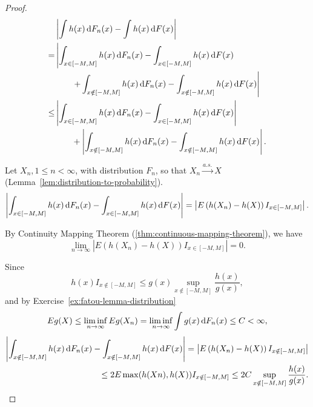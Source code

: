\begin{proof}
	\begin{equation*}
		\begin{aligned}
			     & \left|\int h(x)\dif F_{n}(x)-\int h(x)\dif F(x)\right|                                             \\
			=    & \left|\int_{x\in[-M,M]} h(x)\dif F_{n}(x) - \int_{x\in[-M,M]} h(x)\dif F(x) \right.                \\
			     & \qquad \left. + \int_{x\notin[-M,M]} h(x)\dif F_{n}(x) - \int_{x\notin[-M,M]} h(x)\dif F(x)\right| \\
			\leq & \left|\int_{x\in[-M,M]} h(x)\dif F_{n}(x) - \int_{x\in[-M,M]} h(x)\dif F(x)\right|                 \\
			     & \qquad + \left|\int_{x\notin[-M,M]} h(x)\dif F_{n}(x) - \int_{x\notin[-M,M]} h(x)\dif F(x)\right|.
		\end{aligned}
	\end{equation*}

	Let \(X_n,1\leq n<\infty\), with distribution \(F_n\), so that \(X_n\stackrel{a.s.}{\rightarrow}X\) (Lemma~\ref{lem:distribution-to-probability}).
	\begin{equation*}
		\left|\int_{x\in[-M,M]}h(x)\mathop{}\!\mathrm{d} F_{n}(x)-\int_{x\in[-M,M]}h(x)\mathop{}\!\mathrm{d} F(x)\right| = \left|E\left(h(X_n)-h(X)\right)I_{x\in[-M,M]}\right|.
	\end{equation*}

	By Continuity Mapping Theorem (\ref{thm:continuous-mapping-theorem}), we have
	\begin{equation*}
		\lim_{n\rightarrow\infty}\left|E\left(h(X_n)-h(X)\right)I_{x\in[-M,M]}\right| = 0.
	\end{equation*}

	Since
	\begin{equation*}
		h(x)I_{x\notin[-M,M]}\leq g(x)\sup_{x\notin[-M,M]}\frac{h(x)}{g(x)},
	\end{equation*}
	and by Exercise~\ref{ex:fatou-lemma-distribution}
	\begin{equation*}
		Eg(X) \leq \liminf_{n\rightarrow\infty}Eg(X_n)=\liminf_{n\rightarrow\infty}\int g(x)\mathop{}\!\mathrm{d} F_{n}(x)\leq C<\infty,
	\end{equation*}
	\begin{equation*}
		\begin{aligned}
			\left|\int_{x\notin[-M,M]}h(x)\mathop{}\!\mathrm{d} F_{n}(x)-\int_{x\notin[-M,M]}h(x)\mathop{}\!\mathrm{d} F(x)\right| = \left|E\left(h(X_n)-h(X)\right)I_{x\notin[-M,M]}\right| \\
			\leq 2E\max(h(Xn),h(X))I_{x\notin[-M,M]}\leq 2C\sup_{x\notin[-M,M]}\frac{h(x)}{g(x)}.                                                          \\
		\end{aligned}
	\end{equation*}


\end{proof}
